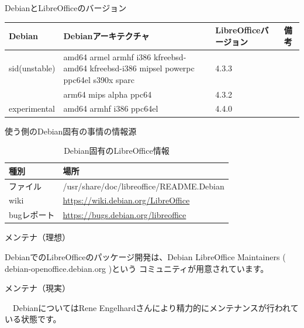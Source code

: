 \begin{frame}{DebianとLibreOfficeのバージョン}

\begin{table}[ht]
\begin{center}
\small
\begin{tabular}{|l|p{3cm}|l|l|}
\hline 
Debian&Debianアーキテクチャ&LibreOfficeバージョン& 備考\\ \hline \hline
sid(unstable) & amd64 armel armhf i386 kfreebsd-amd64 kfreebsd-i386 mipsel powerpc ppc64el s390x sparc & 4.3.3 & \\ \cline{2-4} 
 & arm64 mips alpha ppc64 & 4.3.2 & \\ \hline
experimental & amd64 armhf i386 ppc64el & 4.4.0 & \\ \hline
\end{tabular}
\end{center}
\end{table}
\end{frame}

\begin{frame}{使う側のDebian固有の事情の情報源}

\begin{table}[ht]
\begin{center}
\small
\begin{tabular}{|l|p{7cm}|}
\hline
種別 & 場所  \\ \hline \hline
ファイル & /usr/share/doc/libreoffice/README.Debian  \\ \hline
wiki & \url{https://wiki.debian.org/LibreOffice}  \\ \hline
bugレポート & \url{https://bugs.debian.org/libreoffice}  \\ \hline
\end{tabular}
\end{center}
\caption{Debian固有のLibreOffice情報}
\label{tab:debian-specific-about-libreoffice}
\end{table}


\end{frame}

\begin{frame}{メンテナ（理想）}

 DebianでのLibreOfficeのパッケージ開発は、Debian LibreOffice Maintainers ( debian-openoffice\@lists.debian.org )という
コミュニティが用意されています。

\end{frame}

\begin{frame}{メンテナ（現実）}

　DebianについてはRene Engelhardさんにより精力的にメンテナンスが行われている状態です。
　
\end{frame}

